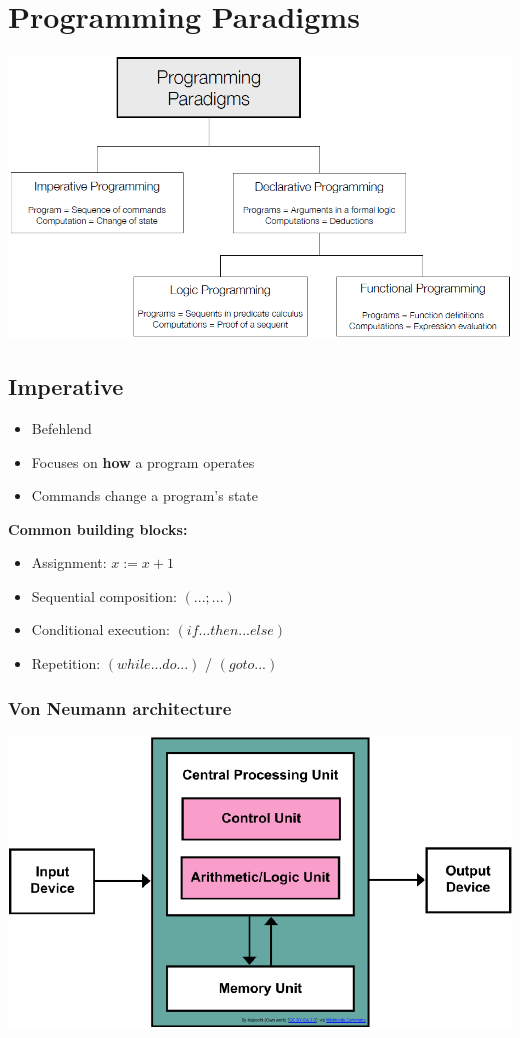 \section{Programming Paradigms}
\includegraphics[width=\linewidth]{../img/programming_paradigms.png}
\subsection{Imperative}
\begin{itemize}
    \item Befehlend
    \item Focuses on \textbf{how} a program operates
    \item Commands change a program's state
\end{itemize}
\textbf{Common building blocks:}
\begin{itemize}
    \item Assignment: $x := x + 1$
    \item Sequential composition: $(... ; ...)$
    \item Conditional execution: $(if ... then ... else)$
    \item Repetition: $(while ... do ...)$ / $(goto ...)$
\end{itemize}
\subsubsection{Von Neumann architecture}
\includegraphics[width=0.7\linewidth]{../img/imperative_programming.png}\\

